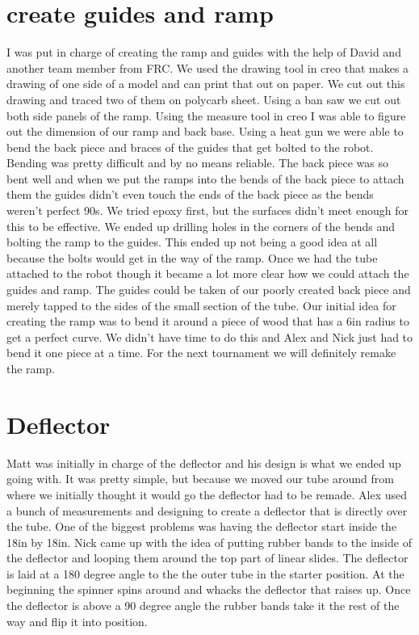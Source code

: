 \section*{create guides and ramp}
I was put in charge of creating the ramp and guides with the help of David and another team member from FRC. We used the drawing tool in creo that makes a drawing of one side of a model and can print that out on paper. We cut out this drawing and traced two of them on polycarb sheet. Using a ban saw we cut out both side panels of the ramp. Using the measure tool in creo I was able to figure out the dimension of our ramp and back base. Using a heat gun we were able to bend the back piece and braces of the guides that get bolted to the robot. Bending was pretty difficult and by no means reliable. The back piece was so bent well and when we put the ramps into the bends of the back piece to attach them the guides didn’t even touch the ends of the back piece as the bends weren’t perfect 90s. We tried epoxy first, but the surfaces didn’t meet enough for this to be effective. We ended up drilling holes in the corners of the bends and bolting the ramp to the guides. This ended up not being a good idea at all because the bolts would get in the way of the ramp. Once we had the tube attached to the robot though it became a lot more clear how we could attach the guides and ramp. The guides could be taken of our poorly created back piece and merely tapped to the sides of the small section of the tube. Our initial idea for creating the ramp was to bend it around a piece of wood that has a 6in radius to get a perfect curve. We didn’t have time to do this and Alex and Nick just had to bend it one piece at a time. For the next tournament we will definitely remake the ramp.

\section*{Deflector}
Matt was initially in charge of the deflector and his design is what we ended up going with. It was pretty simple, but because we moved our tube around from where we initially thought it would go the deflector had to be remade. Alex used a bunch of measurements and designing to create a deflector that is directly over the tube. One of the biggest problems was having the deflector start inside the 18in by 18in. Nick came up with the idea of putting rubber bands to the inside of the deflector and looping them around the top part of linear slides. The deflector is laid at a 180 degree angle to the the outer tube in the starter position. At the beginning the spinner spins around and whacks the deflector that raises up. Once the deflector is above a 90 degree angle the rubber bands take it the rest of the way and flip it into position. 

